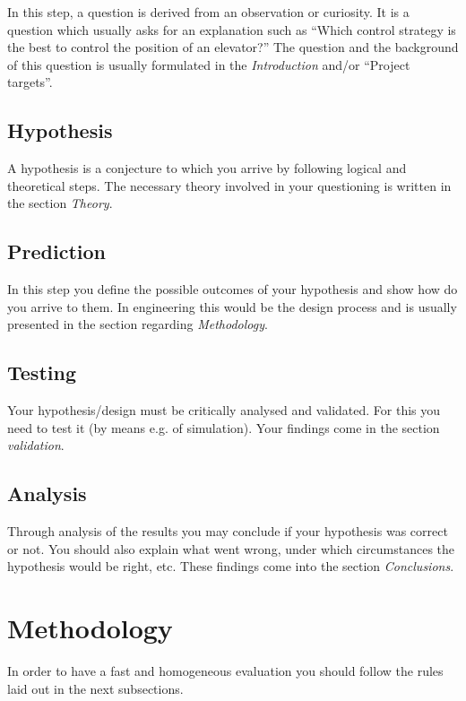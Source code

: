 	In this step, a question is derived from an observation or curiosity. It is a question which usually asks for an explanation such as ``Which control strategy is the best to control the position of an elevator?'' The question and the background of this question is usually formulated in the \emph{Introduction} and/or ``Project targets''.
	
	\subsection{Hypothesis}
	
	A hypothesis is a conjecture to which you arrive by following logical and theoretical steps. The necessary theory involved in your questioning is written in the section \emph{Theory}.
	
	\subsection{Prediction}
	
	In this step you define the possible outcomes of your hypothesis and show how do you arrive to them. In engineering this would be the design process and is usually presented in the section regarding \emph{Methodology}.
	
	\subsection{Testing}
	
	Your hypothesis/design must be critically analysed and validated. For this you need to test it (by means e.g. of simulation). Your findings come in the section \emph{validation}.
	
	\subsection{Analysis}
	
	Through analysis of the results you may conclude if your hypothesis was correct or not. You should also explain what went wrong, under which circumstances the hypothesis would be right, etc. These findings come into the section \emph{Conclusions}.
	
	\section{Methodology} 
	
	In order to have a fast and homogeneous evaluation you should follow the rules laid out in the next subsections.
	
